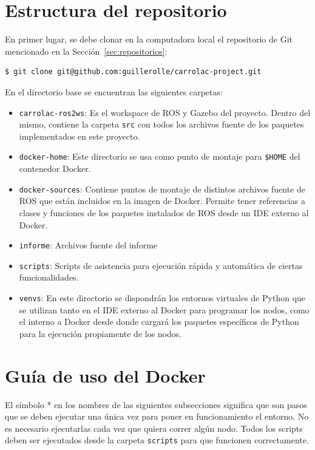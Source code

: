 \documentclass[12pt, a4paper]{report}
\begin{document}
		\section{Estructura del repositorio}\label{sec:estructura-del-repositorio}
	En primer lugar, se debe clonar en la computadora local el repositorio de Git mencionado en la Sección~\ref{sec:repositorios}:
			\begin{lstlisting}[language=Bash,label={lst:lstlisting}]
$ git clone git@github.com:guillerolle/carrolac-project.git
			\end{lstlisting}
			En el directorio base se encuentran las siguientes carpetas:
			\begin{itemize}
				\item \texttt{carrolac-ros2ws}: Es el workspace de ROS y Gazebo del proyecto.
					Dentro del mismo, contiene la carpeta \texttt{src} con todos los archivos fuente de los paquetes implementados en este proyecto.
				\item \texttt{docker-home}: Este directorio se usa como punto de montaje para \texttt{\$HOME} del contenedor Docker.
				\item \texttt{docker-sources}: Contiene puntos de montaje de distintos archivos fuente de ROS que están incluidos en la imagen de Docker.
					Permite tener referencias a clases y funciones de los paquetes instalados de ROS desde un IDE externo al Docker.
				\item \texttt{informe}: Archivos fuente del informe
				\item \texttt{scripts}: Scripts de asistencia para ejecución rápida y automática de ciertas funcionalidades.
				\item \texttt{venvs}: En este directorio se dispondrán los entornos virtuales de Python que se utilizan tanto en el IDE externo al Docker para programar los nodos, como el interno a Docker desde donde cargará los paquetes específicos de Python para la ejecución propiamente de los nodos.
			\end{itemize}

		\section{Guía de uso del Docker}\label{sec:guia-de-uso-del-docker}
	El símbolo * en los nombres de las siguientes subsecciones significa que son pasos que se deben ejecutar una única vez para poner en funcionamiento el entorno.
			No es necesario ejecutarlas cada vez que quiera correr algún nodo.
			Todos los scripts deben ser ejecutados desde la carpeta \texttt{scripts} para que funcionen correctamente.
\end{document}
